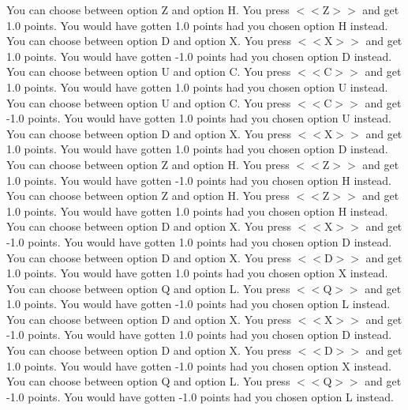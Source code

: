 \documentclass[pdflatex,sn-nature]{sn-jnl}%
\theoremstyle{thmstyleone}%
\theoremstyle{thmstyletwo}%
\theoremstyle{thmstylethree}%
\begin{document}
You can choose between option Z and option H. You press $<<$Z$>>$ and get 1.0 points. You would have gotten 1.0 points had you chosen option H instead.  $~$\\ 
You can choose between option D and option X. You press $<<$X$>>$ and get 1.0 points. You would have gotten -1.0 points had you chosen option D instead.  $~$\\ 
You can choose between option U and option C. You press $<<$C$>>$ and get 1.0 points. You would have gotten 1.0 points had you chosen option U instead.  $~$\\ 
You can choose between option U and option C. You press $<<$C$>>$ and get -1.0 points. You would have gotten 1.0 points had you chosen option U instead.  $~$\\ 
You can choose between option D and option X. You press $<<$X$>>$ and get 1.0 points. You would have gotten 1.0 points had you chosen option D instead.  $~$\\ 
You can choose between option Z and option H. You press $<<$Z$>>$ and get 1.0 points. You would have gotten -1.0 points had you chosen option H instead.  $~$\\ 
You can choose between option Z and option H. You press $<<$Z$>>$ and get 1.0 points. You would have gotten 1.0 points had you chosen option H instead.  $~$\\ 
You can choose between option D and option X. You press $<<$X$>>$ and get -1.0 points. You would have gotten 1.0 points had you chosen option D instead.  $~$\\ 
You can choose between option D and option X. You press $<<$D$>>$ and get 1.0 points. You would have gotten 1.0 points had you chosen option X instead.  $~$\\ 
You can choose between option Q and option L. You press $<<$Q$>>$ and get 1.0 points. You would have gotten -1.0 points had you chosen option L instead.  $~$\\ 
You can choose between option D and option X. You press $<<$X$>>$ and get -1.0 points. You would have gotten 1.0 points had you chosen option D instead.  $~$\\ 
You can choose between option D and option X. You press $<<$D$>>$ and get 1.0 points. You would have gotten -1.0 points had you chosen option X instead.  $~$\\ 
You can choose between option Q and option L. You press $<<$Q$>>$ and get -1.0 points. You would have gotten -1.0 points had you chosen option L instead.  $~$\\ 
\end{document}
